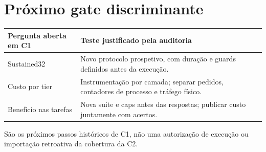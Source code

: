 \section{Próximo gate discriminante}
\begin{tabularx}{\linewidth}{@{}p{37mm}Y@{}}
\toprule \textbf{Pergunta aberta em C1} & \textbf{Teste justificado pela auditoria}\\ \midrule
Sustained32 & Novo protocolo prospetivo, com duração e guards definidos antes da execução.\\
Custo por tier & Instrumentação por camada; separar pedidos, contadores de processo e tráfego físico.\\
Benefício nas tarefas & Nova suite e caps antes das respostas; publicar custo juntamente com acertos.\\
\bottomrule
\end{tabularx}

São os próximos passos históricos de C1, não uma autorização de execução ou importação retroativa da cobertura da C2.
